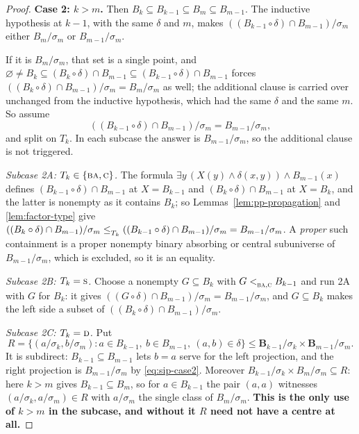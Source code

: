 \begin{proof}
\medskip\noindent\textbf{Case 2: $k>m$.} Then $B_{k}\subseteq B_{k-1}\subseteq
B_{m}\subseteq B_{m-1}$. The inductive hypothesis at $k-1$, with the same
$\delta$ and $m$, makes $((B_{k-1}\circ\delta)\cap B_{m-1})/\sigma_{m}$ either
$B_{m}/\sigma_{m}$ or $B_{m-1}/\sigma_{m}$.

If it is $B_{m}/\sigma_{m}$, that set is a single point, and
$\varnothing\neq B_{k}\subseteq(B_{k}\circ\delta)\cap B_{m-1}\subseteq
(B_{k-1}\circ\delta)\cap B_{m-1}$ forces
$((B_{k}\circ\delta)\cap B_{m-1})/\sigma_{m}=B_{m}/\sigma_{m}$ as well; the
additional clause is carried over unchanged from the inductive hypothesis,
which had the same $\delta$ and the same $m$. So assume
\begin{equation}\label{eq:sip-case2}
  ((B_{k-1}\circ\delta)\cap B_{m-1})/\sigma_{m}=B_{m-1}/\sigma_{m},
\end{equation}
and split on $T_{k}$. In each subcase the answer is $B_{m-1}/\sigma_{m}$, so
the additional clause is not triggered.

\emph{Subcase 2A: $T_{k}\in\{\textup{\textsc{ba}},\textup{\textsc{c}}\}$.} The formula
$\exists y\,(X(y)\wedge\delta(x,y))\wedge B_{m-1}(x)$ defines
$(B_{k-1}\circ\delta)\cap B_{m-1}$ at $X=B_{k-1}$ and
$(B_{k}\circ\delta)\cap B_{m-1}$ at $X=B_{k}$, and the latter is nonempty as it
contains $B_{k}$; so Lemmas~\ref{lem:pp-propagation} and
\ref{lem:factor-type} give
$((B_{k}\circ\delta)\cap B_{m-1})/\sigma_{m}\le_{T_{k}}^{}
((B_{k-1}\circ\delta)\cap B_{m-1})/\sigma_{m}=B_{m-1}/\sigma_{m}$. A
\emph{proper} such containment is a proper nonempty binary absorbing or central
subuniverse of $B_{m-1}/\sigma_{m}$, which is excluded, so it is an equality.

\emph{Subcase 2B: $T_{k}=\textup{\textsc{s}}$.} Choose a nonempty $G\subseteq B_{k}$ with
$G<_{\textup{\textsc{ba}},\textup{\textsc{c}}}^{}B_{k-1}$ and run 2A with $G$ for $B_{k}$: it gives
$((G\circ\delta)\cap B_{m-1})/\sigma_{m}=B_{m-1}/\sigma_{m}$, and
$G\subseteq B_{k}$ makes the left side a subset of
$((B_{k}\circ\delta)\cap B_{m-1})/\sigma_{m}$.

\emph{Subcase 2C: $T_{k}=\textup{\textsc{d}}$.} Put
\[
  R=\bigl\{(a/\sigma_{k},b/\sigma_{m}):a\in B_{k-1},\ b\in B_{m-1},\
    (a,b)\in\delta\bigr\}\le\mathbf B_{k-1}/\sigma_{k}\times
    \mathbf B_{m-1}/\sigma_{m} .
\]
It is subdirect: $B_{k-1}\subseteq B_{m-1}$ lets $b=a$ serve for the left
projection, and the right projection is $B_{m-1}/\sigma_{m}$ by
\eqref{eq:sip-case2}. Moreover $B_{k-1}/\sigma_{k}\times B_{m}/\sigma_{m}
\subseteq R$: here $k>m$ gives $B_{k-1}\subseteq B_{m}$, so for $a\in B_{k-1}$
the pair $(a,a)$ witnesses $(a/\sigma_{k},a/\sigma_{m})\in R$ with
$a/\sigma_{m}$ the single class of $B_{m}/\sigma_{m}$. \textbf{This is the only
use of $k>m$ in the subcase, and without it $R$ need not have a centre at
all.}


\end{proof}
